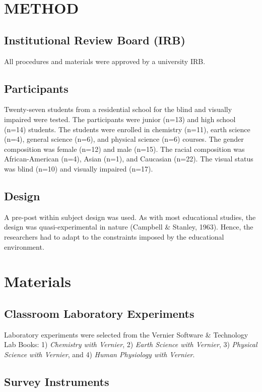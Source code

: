 \documentclass[11.5pt]{sig-alternate} %
\begin{document}
\begin{large}
\section*{METHOD}

\subsection*{Institutional Review Board (IRB)}

All procedures and materials were approved by a university IRB.

\subsection*{Participants}

Twenty-seven students from a residential school for the blind and visually impaired were tested. The participants were junior (n=13) and high school (n=14) students. The students were enrolled in chemistry (n=11), earth science (n=4), general science (n=6), and physical science (n=6) courses. The gender composition was female (n=12) and male (n=15). The racial composition was African-American (n=4), Asian (n=1), and Caucasian (n=22). The visual status was blind (n=10) and visually impaired (n=17).

\subsection*{Design} 
A pre-post within subject design was used. As with most educational studies, the design was quasi-experimental in nature (Campbell \& Stanley, 1963). Hence, the researchers had to adapt to the constraints imposed by the educational environment. 

\section*{Materials}

\subsection*{Classroom Laboratory Experiments}

Laboratory experiments were selected from the Vernier Software \& Technology Lab Books: 1) \textit{Chemistry with Vernier}, 2) \textit{Earth Science with Vernier}, 3) \textit{Physical Science with Vernier}, and 4) \textit{Human Physiology with Vernier}. 

\subsection*{Survey Instruments}


\end{large}
\end{document}
